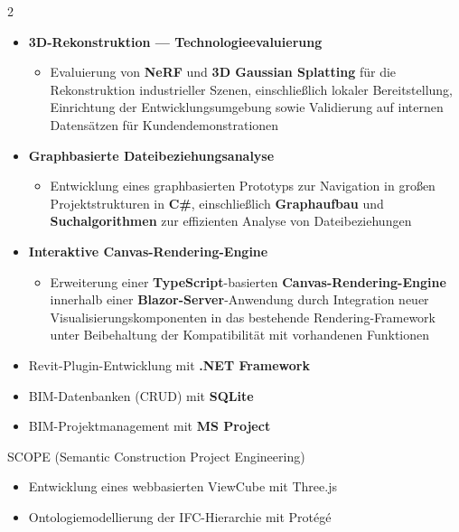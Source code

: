 \documentclass[10pt,a4paper,withhyper]{altacv}
\begin{document}
\begin{paracol}{2}
  \begin{itemize}
    \item \textbf{3D-Rekonstruktion — Technologieevaluierung}
          \begin{itemize}
            \item Evaluierung von \textbf{NeRF} und \textbf{3D Gaussian Splatting} für die Rekonstruktion industrieller Szenen, einschließlich lokaler Bereitstellung, Einrichtung der Entwicklungsumgebung sowie Validierung auf internen Datensätzen für Kundendemonstrationen
          \end{itemize}
    \item \textbf{Graphbasierte Dateibeziehungsanalyse}
          \begin{itemize}
            \item Entwicklung eines graphbasierten Prototyps zur Navigation in großen Projektstrukturen in \textbf{C\#}, einschließlich \textbf{Graphaufbau} und \textbf{Suchalgorithmen} zur effizienten Analyse von Dateibeziehungen
          \end{itemize}
    \item \textbf{Interaktive Canvas-Rendering-Engine}
          \begin{itemize}
            \item Erweiterung einer \textbf{TypeScript}-basierten \textbf{Canvas-Rendering-Engine} innerhalb einer \textbf{Blazor-Server}-Anwendung durch Integration neuer Visualisierungskomponenten in das bestehende Rendering-Framework unter Beibehaltung der Kompatibilität mit vorhandenen Funktionen
          \end{itemize}
  \end{itemize}




  \begin{itemize}
    \item Revit-Plugin-Entwicklung mit \textbf{.NET Framework}
    \item BIM-Datenbanken (CRUD) mit \textbf{SQLite}
    \item BIM-Projektmanagement mit \textbf{MS Project}
  \end{itemize}


  SCOPE (Semantic Construction Project Engineering)
  \begin{itemize}
    \item Entwicklung eines webbasierten ViewCube mit Three.js
    \item Ontologiemodellierung der IFC-Hierarchie mit Protégé
  \end{itemize}

  \divider



  \medskip


\end{paracol}
\end{document}

